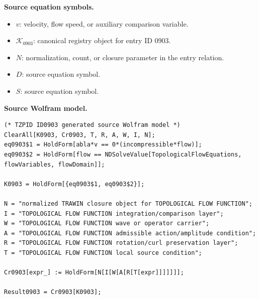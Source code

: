 \begin{minipage}[t]{0.49\linewidth}
\begingroup
\small
\raggedright
\textbf{Source equation symbols.}\par
\begin{itemize}[leftmargin=1.35em,itemsep=1pt,topsep=1pt,parsep=0pt]
    \item $v$: velocity, flow speed, or auxiliary comparison variable.
    \item $\mathcal{K}_{0903}$: canonical registry object for entry ID 0903.
    \item $N$: normalization, count, or closure parameter in the entry relation.
    \item $D$: source equation symbol.
    \item $S$: source equation symbol.
\end{itemize}
\endgroup
\end{minipage}\hfill
\begin{minipage}[t]{0.47\linewidth}
\begingroup
\scriptsize
\raggedright
\textbf{Source Wolfram model.}\par
\begin{Verbatim}[fontsize=\tiny,breaklines=true,breakanywhere=true]
(* TZPID ID0903 generated source Wolfram model *)
ClearAll[K0903, Cr0903, T, R, A, W, I, N];
eq0903$1 = HoldForm[abla*v == 0*(incompressible*flow)];
eq0903$2 = HoldForm[flow == NDSolveValue[TopologicalFlowEquations, flowVariables, flowDomain]];

K0903 = HoldForm[{eq0903$1, eq0903$2}];

N = "normalized TRAWIN closure object for TOPOLOGICAL FLOW FUNCTION";
I = "TOPOLOGICAL FLOW FUNCTION integration/comparison layer";
W = "TOPOLOGICAL FLOW FUNCTION wave or operator carrier";
A = "TOPOLOGICAL FLOW FUNCTION admissible action/amplitude condition";
R = "TOPOLOGICAL FLOW FUNCTION rotation/curl preservation layer";
T = "TOPOLOGICAL FLOW FUNCTION local source condition";

Cr0903[expr_] := HoldForm[N[I[W[A[R[T[expr]]]]]]];

Result0903 = Cr0903[K0903];
\end{Verbatim}
\endgroup
\end{minipage}

